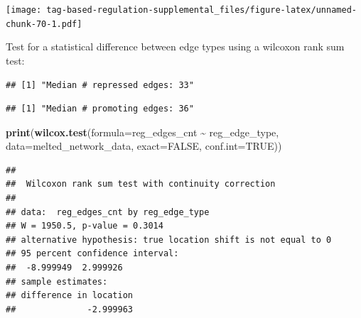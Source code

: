 \documentclass[
]{book}
\newenvironment{Shaded}{\begin{snugshade}}{\end{snugshade}}
\newcommand{\DataTypeTok}[1]{\textcolor[rgb]{0.13,0.29,0.53}{#1}}
\newcommand{\KeywordTok}[1]{\textcolor[rgb]{0.13,0.29,0.53}{\textbf{#1}}}
\newcommand{\NormalTok}[1]{#1}
\newcommand{\OperatorTok}[1]{\textcolor[rgb]{0.81,0.36,0.00}{\textbf{#1}}}
\newcommand{\OtherTok}[1]{\textcolor[rgb]{0.56,0.35,0.01}{#1}}
\newcommand{\StringTok}[1]{\textcolor[rgb]{0.31,0.60,0.02}{#1}}
\begin{document}
\texttt{[image: tag-based-regulation-supplemental\_files/figure-latex/unnamed-chunk-70-1.pdf]}

Test for a statistical difference between edge types using a wilcoxon rank sum test:

\begin{Shaded}
\end{Shaded}

\begin{verbatim}
## [1] "Median # repressed edges: 33"
\end{verbatim}

\begin{Shaded}
\end{Shaded}

\begin{verbatim}
## [1] "Median # promoting edges: 36"
\end{verbatim}

\begin{Shaded}
\begin{Highlighting}[]
\KeywordTok{print}\NormalTok{(}\KeywordTok{wilcox.test}\NormalTok{(}\DataTypeTok{formula=}\NormalTok{reg\_edges\_cnt }\OperatorTok{\textasciitilde{}}\StringTok{ }\NormalTok{reg\_edge\_type, }\DataTypeTok{data=}\NormalTok{melted\_network\_data, }\DataTypeTok{exact=}\OtherTok{FALSE}\NormalTok{, }\DataTypeTok{conf.int=}\OtherTok{TRUE}\NormalTok{))}
\end{Highlighting}
\end{Shaded}

\begin{verbatim}
## 
##  Wilcoxon rank sum test with continuity correction
## 
## data:  reg_edges_cnt by reg_edge_type
## W = 1950.5, p-value = 0.3014
## alternative hypothesis: true location shift is not equal to 0
## 95 percent confidence interval:
##  -8.999949  2.999926
## sample estimates:
## difference in location 
##              -2.999963
\end{verbatim}
\end{document}
